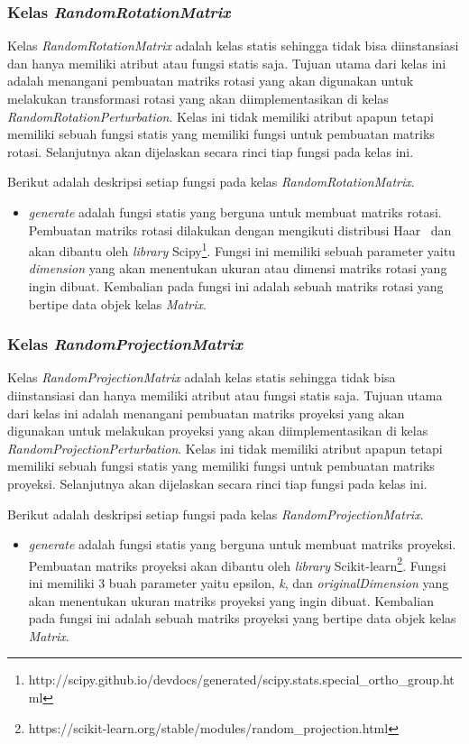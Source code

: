 \subsubsection{Kelas \textit{RandomRotationMatrix}}
\label{subsubsec:kelas-rrm}

Kelas \textit{RandomRotationMatrix} adalah kelas statis sehingga tidak bisa diinstansiasi dan hanya memiliki atribut atau fungsi statis saja. Tujuan utama dari kelas ini adalah menangani pembuatan matriks rotasi yang akan digunakan untuk melakukan transformasi rotasi yang akan diimplementasikan di kelas \textit{RandomRotationPerturbation}. Kelas ini tidak memiliki atribut apapun tetapi memiliki sebuah fungsi statis yang memiliki fungsi untuk pembuatan matriks rotasi. Selanjutnya akan dijelaskan secara rinci tiap fungsi pada kelas ini.

Berikut adalah deskripsi setiap fungsi pada kelas \textit{RandomRotationMatrix}.
\begin{itemize}
	\item \textit{generate} adalah fungsi statis yang berguna untuk membuat matriks rotasi. Pembuatan matriks rotasi dilakukan dengan mengikuti distribusi Haar~\cite{stewart:80:orthogonal} dan akan dibantu oleh \textit{library} Scipy\footnote{http://scipy.github.io/devdocs/generated/scipy.stats.special\_ortho\_group.html}. Fungsi ini memiliki sebuah parameter yaitu \textit{dimension} yang akan menentukan ukuran atau dimensi matriks rotasi yang ingin dibuat. Kembalian pada fungsi ini adalah sebuah matriks rotasi yang bertipe data objek kelas \textit{Matrix}.
\end{itemize}

\subsubsection{Kelas \textit{RandomProjectionMatrix}}
\label{subsubsec:kelas-rrm}

Kelas \textit{RandomProjectionMatrix} adalah kelas statis sehingga tidak bisa diinstansiasi dan hanya memiliki atribut atau fungsi statis saja. Tujuan utama dari kelas ini adalah menangani pembuatan matriks proyeksi yang akan digunakan untuk melakukan proyeksi yang akan diimplementasikan di kelas \textit{RandomProjectionPerturbation}. Kelas ini tidak memiliki atribut apapun tetapi memiliki sebuah fungsi statis yang memiliki fungsi untuk pembuatan matriks proyeksi. Selanjutnya akan dijelaskan secara rinci tiap fungsi pada kelas ini.

Berikut adalah deskripsi setiap fungsi pada kelas \textit{RandomProjectionMatrix}.
\begin{itemize}
	\item \textit{generate} adalah fungsi statis yang berguna untuk membuat matriks proyeksi. Pembuatan matriks proyeksi akan dibantu oleh \textit{library} Scikit-learn\footnote{https://scikit-learn.org/stable/modules/random\_projection.html}. Fungsi ini memiliki 3 buah parameter yaitu epsilon, \textit{k}, dan \textit{originalDimension} yang akan menentukan ukuran matriks proyeksi yang ingin dibuat. Kembalian pada fungsi ini adalah sebuah matriks proyeksi yang bertipe data objek kelas \textit{Matrix}.
\end{itemize}

